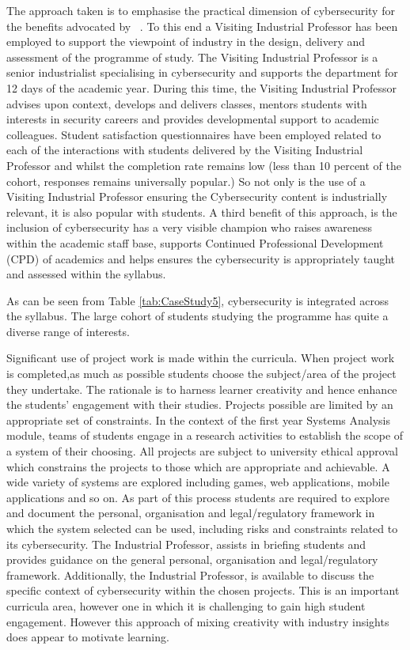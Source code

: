 \documentclass[conference]{IEEEtran}
\begin{document}
The approach taken is to emphasise the practical dimension of cybersecurity for the benefits advocated by ~\cite{Weiss:2013:THC:2527148.2527180}. To this end a Visiting Industrial Professor has been employed to support the viewpoint of industry in the design, delivery and assessment of the programme of study. The Visiting Industrial Professor is a senior industrialist specialising in cybersecurity and supports the department for 12 days of the academic year. During this time, the Visiting Industrial Professor advises upon context, develops and delivers classes, mentors students with interests in security careers and provides developmental support to academic colleagues. Student satisfaction questionnaires have been employed related to each of the interactions with students delivered by the Visiting Industrial Professor and whilst the completion rate remains low (less than 10 percent of the cohort, responses remains universally popular.) So not only is the use of a Visiting Industrial Professor ensuring the Cybersecurity content is industrially relevant, it is also popular with students. A third benefit of this approach, is the inclusion of cybersecurity has a very visible champion who raises awareness within the academic staff base, supports Continued Professional Development (CPD) of academics and helps ensures the cybersecurity is appropriately taught and assessed within the syllabus.

As can be seen from Table {\ref{tab:CaseStudy5}}, cybersecurity is integrated across the syllabus. The  large cohort of students studying the programme has quite a diverse range of interests. 

 

Significant use of project work is made within the curricula. When project work is completed,as much as possible students choose the subject/area of the project they undertake. The rationale is to harness learner creativity {\cite{Bradley2020}} and hence enhance the students' engagement with their studies. Projects possible are limited by an appropriate set of constraints. In the context of the first year Systems Analysis module, teams of students engage in a research activities  to establish the scope of a system of their choosing. All projects are subject to university ethical approval which constrains the projects to those which are appropriate and achievable. A wide variety of systems are explored including games, web applications, mobile applications and so on. As part of this process students are required to explore and document the personal, organisation and legal/regulatory framework in which the system selected can be used, including risks and constraints related to its cybersecurity. The Industrial Professor, assists in briefing students and provides guidance on the general personal, organisation and legal/regulatory framework. Additionally, the Industrial Professor, is available to discuss the specific context of cybersecurity within the chosen projects. This is an important curricula area, however one in which it is challenging to gain high student engagement. However this approach of mixing creativity with industry insights does appear to motivate learning. 
\end{document}
